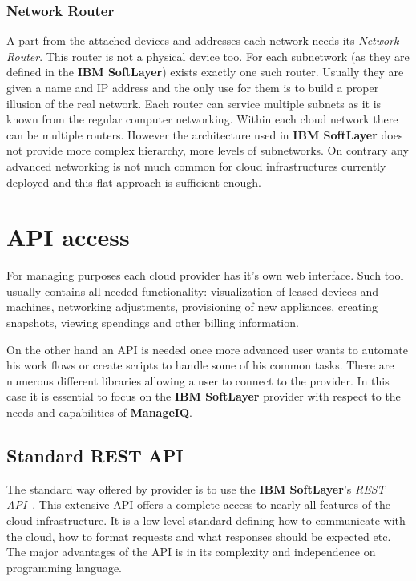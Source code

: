 \subsubsection{Network Router}
\label{subs:Network Router}

A part from the attached devices and addresses each network needs its \emph{Network Router}. This router is not a physical device too. For each subnetwork (as they are defined in the \textbf{IBM SoftLayer}) exists exactly one such router. Usually they are given a name and IP address and the only use for them is to build a proper illusion of the real network. Each router can service multiple subnets as it is known from the regular computer networking. Within each cloud network there can be multiple routers. However the architecture used in \textbf{IBM SoftLayer} does not provide more complex hierarchy, more levels of subnetworks. On contrary any advanced networking is not much common for cloud infrastructures currently deployed and this flat approach is sufficient enough.

\section{API access}
\label{sec:API access}

For managing purposes each cloud provider has it's own web interface. Such tool usually contains all needed functionality: visualization of leased devices and machines, networking adjustments, provisioning of new appliances, creating snapshots, viewing spendings and other billing information.

On the other hand an API is needed once more advanced user wants to automate his work flows or create scripts to handle some of his common tasks. There are numerous different libraries allowing a user to connect to the provider. In this case it is essential to focus on the \textbf{IBM SoftLayer} provider with respect to the needs and capabilities of \textbf{ManageIQ}.

\subsection{Standard REST API}
\label{sub:Standard REST API}

The standard way offered by provider is to use the \textbf{IBM SoftLayer}'s \emph{REST API}~\cite{restapi}. This extensive API offers a complete access to nearly all features of the cloud infrastructure. It is a low level standard defining how to communicate with the cloud, how to format requests and what responses should be expected etc. The major advantages of the API is in its complexity and independence on programming language.

